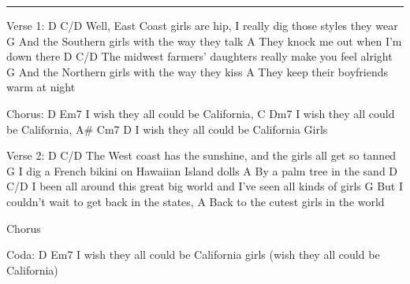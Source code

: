 \noindent\rule{\columnwidth}{1pt}
\begin{lstsong}
Verse 1:
      D                                  C/D
Well, East Coast girls are hip, I really dig those styles they wear
        G
And the Southern girls with the way they talk 
              A
They knock me out when I'm down there
    D                                 C/D
The midwest farmers' daughters really make you feel alright
        G
And the Northern girls with the way they kiss
                A
They keep their boyfriends warm at night

Chorus:
  D                  Em7
I wish they all could be California,
  C                   Dm7
I wish they all could be California,
  A#                   Cm7           D
I wish they all could be California Girls

Verse 2:
    D                                    C/D
The West coast has the sunshine, and the girls all get so tanned
        G
I dig a French bikini on Hawaiian Island dolls
     A
By a palm tree in the sand
  D                                             C/D
I been all around this great big world and I've seen all kinds of girls
      G
But I couldn't wait to get back in the states,
            A
Back to the cutest girls in the world

Chorus
 
Coda:
  D                                  Em7
I wish they all could be California girls
                                           (wish they all could be California)
\end{lstsong}
\newpage
